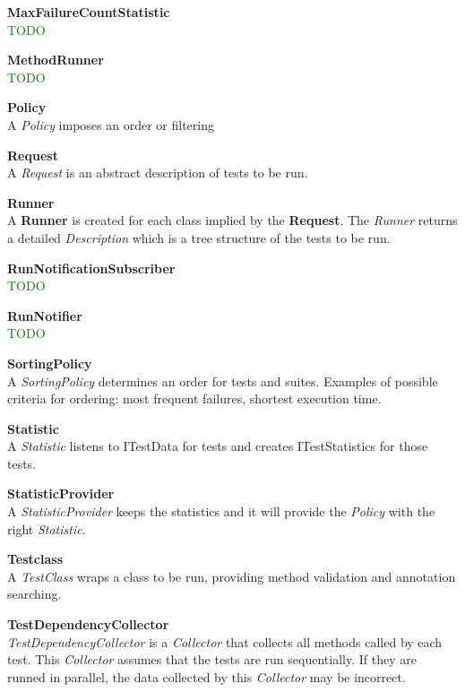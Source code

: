\documentclass[i2]{oss}
\newcommand{\class}[1]{\emph{#1}}
\newcommand{\gloss}[1]{\textbf{#1}}
\newcommand{\comment}[1]{{\huge \textcolor{green}{#1}}\\}
\begin{document}
\begin{description}
\item \gloss{MaxFailureCountStatistic} \\
\comment{TODO}

\item \gloss{MethodRunner}\\
\comment{TODO}

\item \gloss{Policy} \\
A \class{Policy} imposes an order or filtering 

\item \gloss{Request} \\
A \class{Request} is an abstract description of tests to be run. 

\item \gloss{Runner} \\  A \gloss{Runner} is created for each class implied by the \gloss{Request}. The \class{Runner} returns a detailed \class{Description} which is a tree structure of the tests to be run.

\item \gloss{RunNotificationSubscriber} \\
\comment{TODO}


\item \gloss{RunNotifier} \\
\comment{TODO}

\item \gloss{SortingPolicy}\\
 A \class{SortingPolicy} determines an order for tests and suites. Examples of possible criteria for ordering: most frequent failures, shortest execution time.

\item \gloss{Statistic} \\
A \class{Statistic} listens to ITestData for tests and creates ITestStatistics for those tests.

\item \gloss{StatisticProvider} \\
A \class{StatisticProvider} keeps the statistics and it will provide the \class{Policy} with the right \class{Statistic}.

\item \gloss{Testclass} \\
 A \class{TestClass} wraps a class to be run, providing method validation and annotation searching.

\item \gloss{TestDependencyCollector} \\
\class{TestDependencyCollector} is a \class{Collector} that collects all methods called by each test. This \class{Collector} assumes that the tests are run sequentially. If they are runned in parallel, the data collected by this \class{Collector} may be incorrect.



\end{description}
\end{document}

